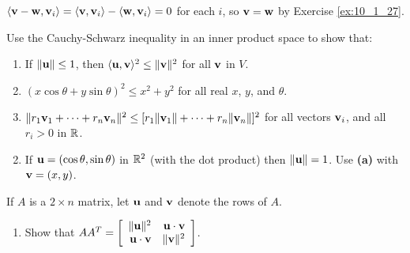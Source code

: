 \begin{multicols}{2}
\begin{ex}
\begin{sol}
$\langle \textbf{v} - \textbf{w}, \textbf{v}_{i} \rangle = \langle \textbf{v}, \textbf{v}_{i} \rangle - \langle \textbf{w}, \textbf{v}_{i} \rangle = 0$ for each $i$, so $\textbf{v} = \textbf{w}$ by Exercise \ref{ex:10_1_27}.
\end{sol}
\end{ex}

\begin{ex}
Use the Cauchy-Schwarz inequality in an inner product space to show that:

\begin{enumerate}[label={\alph*.}]
\item If $\|\textbf{u}\| \leq 1$, then $\langle\textbf{u}, \textbf{v}\rangle^{2} \leq \|\textbf{v}\|^{2}$ for all $\textbf{v}$ in $V$.

\item $(x \cos \theta + y \sin \theta)^{2} \leq x^{2} + y^{2}$ for all real $x$, $y$, and $\theta$.

\item $\| r_1\textbf{v}_1 + \dots + r_n\textbf{v}_n \| ^2 \leq [r_1 \| \textbf{v}_1 \| + \dots + r_n \| \textbf{v}_n \| ]^2$
for all vectors $\textbf{v}_{i}$, and all $r_{i} > 0$ in $\mathbb{R}$.

\end{enumerate}
\begin{sol}
\begin{enumerate}[label={\alph*.}]
\setcounter{enumi}{1}
\item  If $\textbf{u} = (\cos \theta, \sin \theta)$ in $\mathbb{R}^2$ (with the dot product) then $\|\textbf{u}\| = 1$. Use \textbf{(a)} with $\textbf{v} = (x, y)$.

\end{enumerate}
\end{sol}
\end{ex}

\begin{ex}
If $A$ is a $2 \times n$ matrix, let $\textbf{u}$ and $\textbf{v}$ denote the rows of $A$.

\begin{enumerate}[label={\alph*.}]
\item Show that 
$AA^T = \left[ \begin{array}{rr}
\| \textbf{u} \| ^2 & \textbf{u} \cdot \textbf{v} \\
\textbf{u} \cdot \textbf{v} & \| \textbf{v} \| ^2
\end{array} \right]$.


\end{enumerate}
\end{ex}
\end{multicols}
